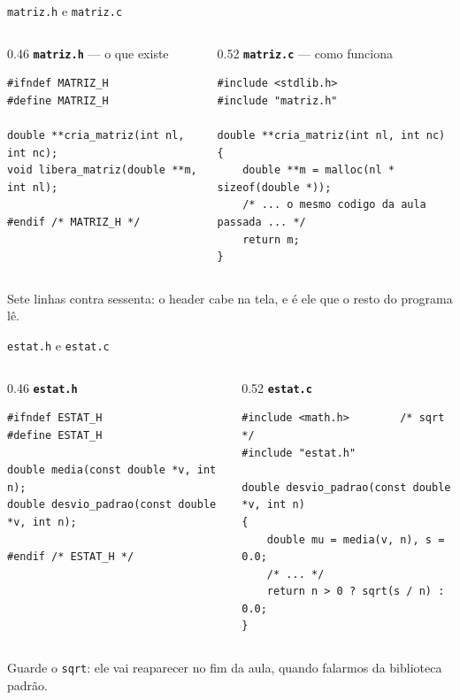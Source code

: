 \documentclass[aspectratio=169]{beamer}
\begin{document}
\begin{frame}[fragile]{\texttt{matriz.h} e \texttt{matriz.c}}
  \begin{columns}[T]
    \begin{column}{0.46\textwidth}
      \textbf{\texttt{matriz.h}} --- o que existe
\begin{lstlisting}[basicstyle=\ttfamily\tiny, numbers=none]
#ifndef MATRIZ_H
#define MATRIZ_H

double **cria_matriz(int nl, int nc);
void libera_matriz(double **m, int nl);

#endif /* MATRIZ_H */
\end{lstlisting}
    \end{column}
    \begin{column}{0.52\textwidth}
      \textbf{\texttt{matriz.c}} --- como funciona
\begin{lstlisting}[basicstyle=\ttfamily\tiny, numbers=none]
#include <stdlib.h>
#include "matriz.h"

double **cria_matriz(int nl, int nc)
{
    double **m = malloc(nl * sizeof(double *));
    /* ... o mesmo codigo da aula passada ... */
    return m;
}
\end{lstlisting}
    \end{column}
  \end{columns}
  \begin{block}{}
    \small Sete linhas contra sessenta: o header cabe na tela, e é ele que o
    resto do programa lê.
  \end{block}
\end{frame}

\begin{frame}[fragile]{\texttt{estat.h} e \texttt{estat.c}}
  \begin{columns}[T]
    \begin{column}{0.46\textwidth}
      \textbf{\texttt{estat.h}}
\begin{lstlisting}[basicstyle=\ttfamily\tiny, numbers=none]
#ifndef ESTAT_H
#define ESTAT_H

double media(const double *v, int n);
double desvio_padrao(const double *v, int n);

#endif /* ESTAT_H */
\end{lstlisting}
    \end{column}
    \begin{column}{0.52\textwidth}
      \textbf{\texttt{estat.c}}
\begin{lstlisting}[basicstyle=\ttfamily\tiny, numbers=none]
#include <math.h>        /* sqrt */
#include "estat.h"

double desvio_padrao(const double *v, int n)
{
    double mu = media(v, n), s = 0.0;
    /* ... */
    return n > 0 ? sqrt(s / n) : 0.0;
}
\end{lstlisting}
    \end{column}
  \end{columns}
  \begin{block}{}
    \small Guarde o \texttt{sqrt}: ele vai reaparecer no fim da aula, quando
    falarmos da biblioteca padrão.
  \end{block}
\end{frame}
\end{document}
